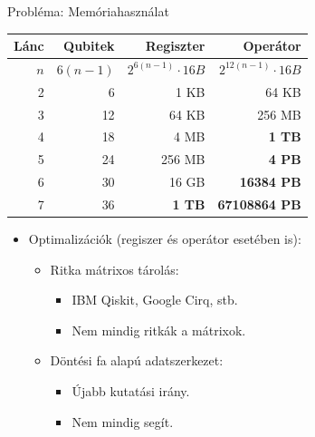 \documentclass[aspectratio=169]{beamer}
\begin{document}
\begin{frame}[t]{Probléma: Memóriahasználat}
\vspace{2mm}
\begin{tabular}{r|r|r|r}
Lánc & Qubitek & Regiszter & Operátor \\
\hline
\rule{0pt}{1.05\normalbaselineskip} $n$ & $6(n-1)$ & $2^{6(n-1)} \cdot{} 16 B$ & ${2^{12(n-1)}} \cdot{} 16 B$  \pause{} \\
\hline
2 & 6 &  1 KB &  64 KB \\
3 & 12 &  64 KB &  256 MB \\
4 & 18 &  4 MB & \color{red} \textbf{1 TB} \\
5 & 24 &  256 MB & \color{red} \textbf{4 PB} \\
6 & 30 &  16 GB & \color{red} \textbf{16384 PB} \\
7 & 36 & \color{red} \textbf{1 TB} & \color{red} \textbf{67108864 PB}
\end{tabular}
\pause
\vspace{2mm}
\begin{itemize}
    \item Optimalizációk (regiszer és operátor esetében is):
    \begin{itemize}
        \item Ritka mátrixos tárolás:
        \begin{itemize}
          \item IBM Qiskit, Google Cirq, stb.
          \item Nem mindig ritkák a mátrixok.
        \end{itemize}
        \item Döntési fa alapú adatszerkezet:
        \begin{itemize}
            \item Újabb kutatási irány.
            \item Nem mindig segít.
        \end{itemize}
    \end{itemize}
\end{itemize}

\end{frame}

\end{document}
